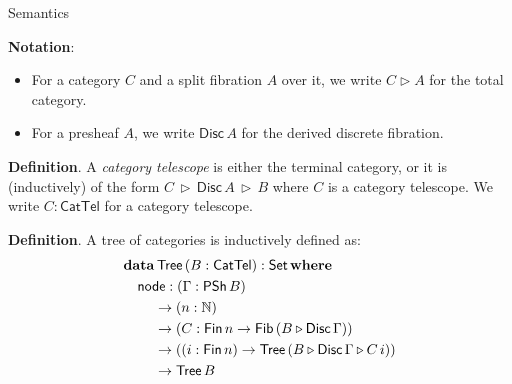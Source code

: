 \documentclass[dvipsnames,aspectratio=169]{beamer}
\newcommand{\ms}[1]{\mathsf{#1}}
\newcommand{\mbb}[1]{\mathbb{#1}}
\newcommand{\mbf}[1]{\mathbf{#1}}
\newcommand{\Set}{\mathsf{Set}}
\newcommand{\CatTel}{\mathsf{CatTel}}
\newcommand{\Fib}{\mathsf{Fib}}
\newcommand{\Fin}{\mathsf{Fin}}
\newcommand{\Tree}{\mathsf{Tree}}
\newcommand{\Disc}{\mathsf{Disc}}
\newcommand{\PSh}{\mathsf{PSh}}
\newcommand{\ext}{\triangleright}
\begin{document}
\begin{frame}{Semantics}

\textbf{Notation}:
\begin{itemize}
\item For a category $C$ and a split fibration $A$ over it, we write $C \ext A$ for the total category.
\item For a presheaf $A$, we write $\Disc\,A$ for the derived discrete fibration.
\end{itemize}
\vspace{1em}

\textbf{Definition}. A \emph{category telescope} is either the terminal category, or it is
(inductively) of the form $C\,\ext\,\Disc\,A\,\ext\,B$ where $C$ is a category telescope. We write
$C : \CatTel$ for a category telescope.
\vspace{1em}

\textbf{Definition}. A tree of categories is inductively defined as:
\begin{alignat*}{3}
  & \mbf{data}\,\Tree\,(B : \CatTel) : \Set\,\mbf{where}\\
  & \hspace{1em} \ms{node} : (\Gamma : \PSh\,B)\\
  & \hspace{2.2em} \to  (n : \mbb{N})\\
  & \hspace{2.2em} \to  (C : \Fin\,n \to \Fib\,(B \ext \Disc\,\Gamma))\\
  & \hspace{2.2em} \to ((i : \Fin\,n) \to \Tree\,(B \ext \Disc\,\Gamma \ext C\,i))\\
  & \hspace{2.2em} \to \Tree\,B
\end{alignat*}

\end{frame}
\end{document}
